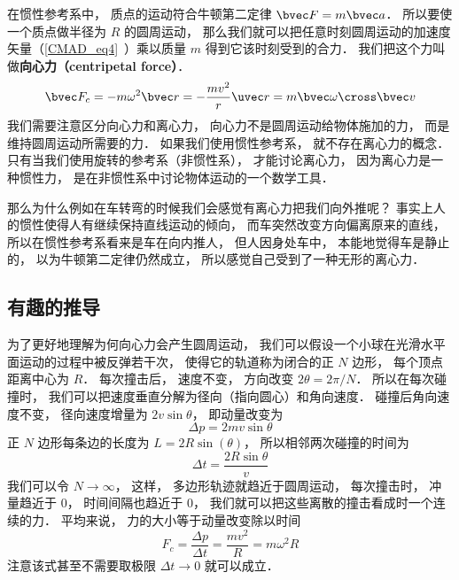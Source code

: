 

在惯性参考系中， 质点的运动符合牛顿第二定律 $\bvec F = m\bvec a$． 所以要使一个质点做半径为 $R$ 的圆周运动， 那么我们就可以把任意时刻圆周运动的加速度矢量（\autoref{CMAD_eq4}~）乘以质量 $m$ 得到它该时刻受到的合力． 我们把这个力叫做\textbf{向心力（centripetal force）}．
\begin{equation}
\bvec F_c = -m \omega^2 \bvec r = -\frac{mv^2}{r}\uvec r = m\bvec \omega \cross \bvec v
\end{equation}
我们需要注意区分向心力和离心力， 向心力不是圆周运动给物体施加的力， 而是维持圆周运动所需要的力． 如果我们使用惯性参考系， 就不存在离心力的概念． 只有当我们使用旋转的参考系（非惯性系）， 才能讨论离心力， 因为离心力是一种惯性力， 是在非惯性系中讨论物体运动的一个数学工具．

那么为什么例如在车转弯的时候我们会感觉有离心力把我们向外推呢？ 事实上人的惯性使得人有继续保持直线运动的倾向， 而车突然改变方向偏离原来的直线， 所以在惯性参考系看来是车在向内推人， 但人因身处车中， 本能地觉得车是静止的， 以为牛顿第二定律仍然成立， 所以感觉自己受到了一种无形的离心力．

\subsection{有趣的推导}
为了更好地理解为何向心力会产生圆周运动， 我们可以假设一个小球在光滑水平面运动的过程中被反弹若干次， 使得它的轨道称为闭合的正 $N$ 边形， 每个顶点距离中心为 $R$． 每次撞击后， 速度不变， 方向改变 $2\theta  = 2\pi/N$．
所以在每次碰撞时， 我们可以把速度垂直分解为径向（指向圆心）和角向速度． 碰撞后角向速度不变， 径向速度增量为 $2v\sin\theta$， 即动量改变为
\begin{equation}
\Delta p = 2mv\sin\theta
\end{equation}
正 $N$ 边形每条边的长度为 $L = 2R\sin(\theta)$， 所以相邻两次碰撞的时间为
\begin{equation}
\Delta t = \frac{2R\sin\theta}{v}
\end{equation}
我们可以令 $N \to \infty$， 这样， 多边形轨迹就趋近于圆周运动， 每次撞击时， 冲量趋近于 0， 时间间隔也趋近于 0， 我们就可以把这些离散的撞击看成时一个连续的力． 平均来说， 力的大小等于动量改变除以时间
\begin{equation}
F_c = \frac{\Delta p}{\Delta t} = \frac{mv^2}{R} = m\omega^2 R
\end{equation}
注意该式甚至不需要取极限 $\Delta t \to 0$ 就可以成立．

